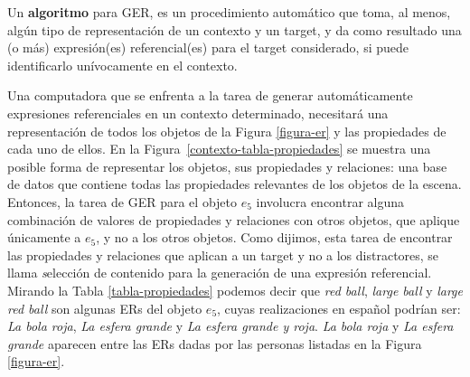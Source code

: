 Un {\bf algoritmo} para GER, es un procedimiento autom\'atico que toma, al menos, alg\'un tipo de representaci\'on de un contexto y un target, y da como resultado una (o m\'as) expresi\'on(es) referencial(es) para el target considerado, si puede identificarlo un\'ivocamente en el contexto.

Una computadora que se enfrenta a la tarea de generar autom\'aticamente expresiones referenciales en un contexto determinado, necesitar\'a una representaci\'on de todos los objetos de la Figura \ref{figura-er} y las propiedades de cada uno de ellos. En la Figura~\ref{contexto-tabla-propiedades} se muestra una posible forma de representar los objetos, sus propiedades y relaciones: una base de datos que contiene todas las propiedades relevantes de los objetos de la escena. Entonces, la tarea de GER para el objeto $e_5$ involucra encontrar alguna combinaci\'on de valores de propiedades y relaciones con otros objetos, que aplique \'unicamente a $e_5$, y no a los otros objetos. Como dijimos, esta tarea de encontrar las propiedades y relaciones que aplican a un target y no a los distractores, se llama {\emph selecci\'on de contenido para la generaci\'on de una expresi\'on referencial}. Mirando la Tabla \ref{tabla-propiedades} podemos decir que {\it red ball}, {\it large ball} y {\it large red ball} son algunas ERs del objeto $e_5$, cuyas realizaciones en espa\~{n}ol podr\'ian ser: {\it La bola roja}, {\it La esfera grande} y {\it La esfera grande y roja}. {\it La bola roja} y {\it La esfera grande} aparecen entre las ERs dadas por las personas listadas en la Figura \ref{figura-er}.

